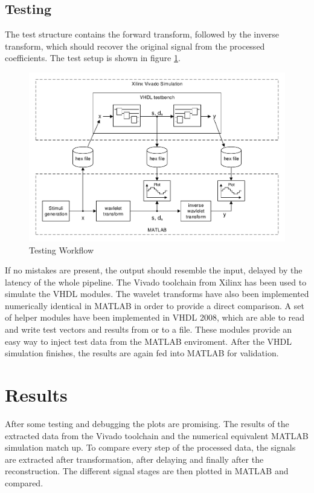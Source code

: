 \begin{refsection}
\subsection{Testing}

The test structure contains the forward transform, followed by the inverse transform, which should recover the original signal from the processed coefficients.
The test setup is shown in figure \ref{fpga:fig:testing}.
\begin{figure}
	\centering
	\includegraphics[width=\textwidth]{papers/fpga/images/vhdl_sim.pdf}
	\caption{Testing Workflow \label{fpga:fig:testing}}
\end{figure}
If no mistakes are present, the output should resemble the input, delayed by the latency of the whole pipeline.
The Vivado toolchain from Xilinx has been used to simulate the VHDL modules.
The wavelet transforms have also been implemented numerically identical in MATLAB in order to provide a direct comparison. 
A set of helper modules have been implemented in VHDL 2008, which are able to read and write test vectors and results from or to a file.
These modules provide an easy way to inject test data from the MATLAB enviroment.
After the VHDL simulation finishes, the results are again fed into MATLAB for validation.

\section{Results}

After some testing and debugging the plots are promising.
The results of the extracted data from the Vivado toolchain and the numerical equivalent MATLAB simulation match up.
To compare every step of the processed data, the signals are extracted after transformation, after delaying and finally after the reconstruction.
The different signal stages are then plotted in MATLAB and compared.


\end{refsection}
